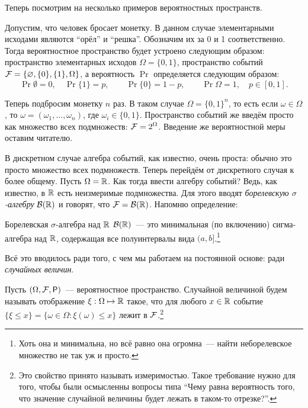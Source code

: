 Теперь посмотрим на несколько примеров вероятностных пространств.
\begin{example}
    Допустим, что человек бросает монетку. В данном случае элементарными 
    исходами являются ``орёл'' и ``решка''.  Обозначим их за 0 и 1 
    соответственно. Тогда вероятностное пространство будет устроено следующим 
    образом: пространство элементарных исходов \(\Omega = \{0, 1\}\), 
    пространство событий \(\mathcal{F} = \{\varnothing, \{0\}, \{1\}, \Omega\}\), а 
    вероятность \(\Pr\) определяется следующим образом: 
    \[
        \Pr{\emptyset} = 0, \quad \Pr{\{1\}} = p, \quad \quad \Pr{\{0\}} = 1 - 
        p,\quad \quad \Pr{\Omega} = 1, \quad p \in [0, 1].
	\]
\end{example}

\begin{example}
    Теперь подбросим монетку \(n\) раз. В таком случае \(\Omega = \{0, 
    1\}^{n}\), то есть если \(\omega \in \Omega\), то \(\omega = (\omega_{1}, 
    \ldots, \omega_{n})\), где \(\omega_{i} \in \{0, 1\}\). Пространство 
    событий же введём просто как множество всех подмножеств: \(\mathcal{F} = 
    2^{\Omega}\). Введение же вероятностной меры оставим читателю.
\end{example}

В дискретном случае алгебра событий, как известно, очень проста: обычно это 
просто множество всех подмножеств. Теперь перейдём от дискретного случая к 
более общему. Пусть \(\Omega = \mathbb{R}\). Как тогда ввести алгебру событий? Ведь, 
как известно, в \(\mathbb{R}\) есть неизмеримые подмножества. Для этого вводят 
\emph{борелевскую \(\sigma\)-алгебру} \(\mathcal{B}(\mathbb{R})\) и говорят, что \(\mathcal{F} =\mathcal{B}(\mathbb{R})\). 
Напомню определение:

\begin{definition}
    Борелевская \(\sigma\)-алгебра над \(\mathbb{R}\) \(\mathcal{B}(\mathbb{R})\)~--- это минимальная 
    (по включению) сигма-алгебра над \(\mathbb{R}\), содержащая все полуинтервалы вида 
    \((a, b]\).\footnote{Хоть она и минимальна, но всё равно она огромна~--- 
    найти неборелевское множество не так уж и просто. }
\end{definition}

Всё это вводилось ради того, с чем мы работаем на постоянной основе: ради 
\emph{случайных величин}. 
\begin{definition}
    Пусть \((\Omega, \F, \Pr)\)~--- вероятностное пространство. Случайной 
    величиной будем называть отображение \(\xi : \Omega \mapsto \mathbb{R}\) такое, что 
    для любого \(x \in \mathbb{R}\) событие \(\{\xi \leq x\} = \{\omega \in \Omega : 
    \xi(\omega) \leq x\}\) лежит в \(\mathcal{F}\).\footnote{Это свойство принято 
    называть измеримостью. Такое требование нужно для того, чтобы были 
    осмысленны вопросы типа ``Чему равна вероятность того, что значение 
    случайной величины будет лежать в таком-то отрезке?''.}
\end{definition}

